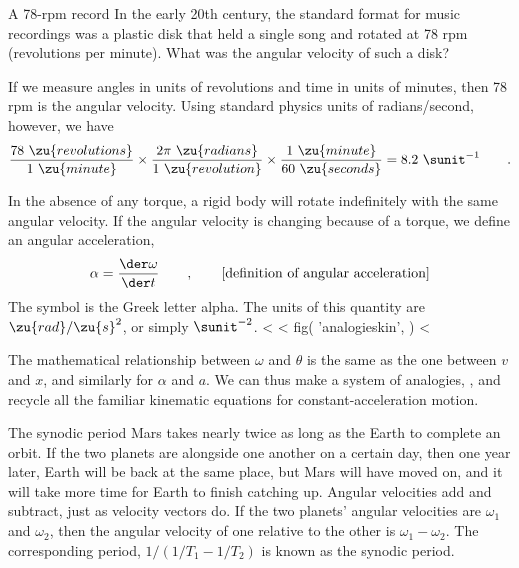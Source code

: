 \begin{eg}{A 78-rpm record}
\egquestion
In the early 20th century, the standard format for
music recordings was a plastic disk that held a single song
and rotated at 78 rpm (revolutions per minute). What was the
angular velocity of such a disk?

\eganswer
If we measure angles in units of revolutions and
time in units of minutes, then 78 rpm is the angular
velocity. Using standard physics units of radians/second,
however, we have
\begin{equation*}
                \frac{78\ \zu{revolutions}}{1\ \zu{minute}}
                \times\frac{2\pi\ \zu{radians}}{1\ \zu{revolution}}
                \times\frac{1\ \zu{minute}}{60\ \zu{seconds}}
                         =  8.2\ \sunit^{-1} \qquad .
\end{equation*}
\end{eg}

In the absence of any torque, a rigid body will rotate
indefinitely with the same angular velocity. If the angular
velocity is changing because of a torque, we define an
angular acceleration,
\begin{equation*}
        \alpha        =          \frac{\der\omega}{\der t}  \qquad , \qquad        
        \text{[definition of
        angular acceleration]}
\end{equation*}
The symbol is the Greek letter alpha. The units of this
quantity are $\zu{rad}/\zu{s}^2$, or simply $\sunit^{-2}$.
<%
<%
  fig(
    'analogieskin',
  )
<%

The mathematical relationship between $\omega$ and $\theta$ is the same as
the one between $v$ and $x$, and similarly for $\alpha$ and $a$. We can
thus make a system of analogies, , and recycle all
the familiar kinematic equations for constant-acceleration
motion.

\begin{eg}{The synodic period}
Mars takes nearly twice as long as the Earth to complete an orbit.
If the two planets are alongside one another on a certain day, then one year
later, Earth will be back at the same place, but Mars will have moved
on, and it will take more time for Earth to finish catching up. Angular
velocities add and subtract, just as velocity
vectors do. If the two planets' angular velocities are $\omega_1$
and $\omega_2$, then the angular velocity of one relative to the other
is $\omega_1-\omega_2$. The corresponding period, $1/(1/T_1-1/T_2)$ is
known as the synodic period.
\end{eg}

